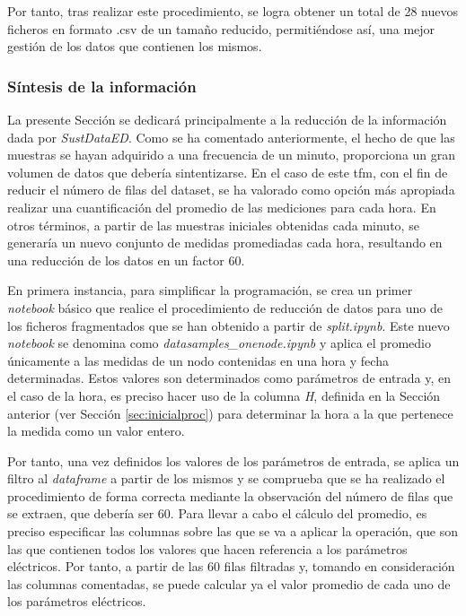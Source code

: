 \vspace{3mm}

Por tanto, tras realizar este procedimiento, se logra obtener un total de 28 nuevos ficheros en formato .csv de un tamaño reducido, permitiéndose así, una mejor gestión de los datos que contienen los mismos.

\subsubsection{Síntesis de la información}
\label{sec:datasamples}

La presente Sección se dedicará principalmente a la reducción de la información dada por \textit{SustDataED}. Como se ha comentado anteriormente, el hecho de que las muestras se hayan adquirido a una frecuencia de un minuto, proporciona un gran volumen de datos que debería sintentizarse. En el caso de este \gls{tfm}, con el fin de reducir el número de filas del dataset, se ha valorado como opción más apropiada realizar una cuantificación del promedio de las mediciones para cada hora. En otros términos, a partir de las muestras iniciales obtenidas cada minuto, se generaría un nuevo conjunto de medidas promediadas cada hora, resultando en una reducción de los datos en un factor 60.

\vspace{3mm}

En primera instancia, para simplificar la programación, se crea un primer \textit{notebook} básico que realice el procedimiento de reducción de datos para uno de los ficheros fragmentados que se han obtenido a partir de \textit{split.ipynb}. Este nuevo \textit{notebook} se denomina como \textit{datasamples\_onenode.ipynb} y aplica el promedio únicamente a las medidas de un nodo contenidas en una hora y fecha determinadas. Estos valores son determinados como parámetros de entrada y, en el caso de la hora, es preciso hacer uso de la columna \textit{H}, definida en la Sección anterior (ver Sección \ref{sec:inicialproc}) para determinar la hora a la que pertenece la medida como un valor entero.

\vspace{3mm}

Por tanto, una vez definidos los valores de los parámetros de entrada, se aplica un filtro al \textit{dataframe} a partir de los mismos y se comprueba que se ha realizado el procedimiento de forma correcta mediante la observación del número de filas que se extraen, que debería ser 60. Para llevar a cabo el cálculo del promedio, es preciso especificar las columnas sobre las que se va a aplicar la operación, que son las que contienen todos los valores que hacen referencia a los parámetros eléctricos. Por tanto, a partir de las 60 filas filtradas y, tomando en consideración las columnas comentadas, se puede calcular ya el valor promedio de cada uno de los parámetros eléctricos. 

